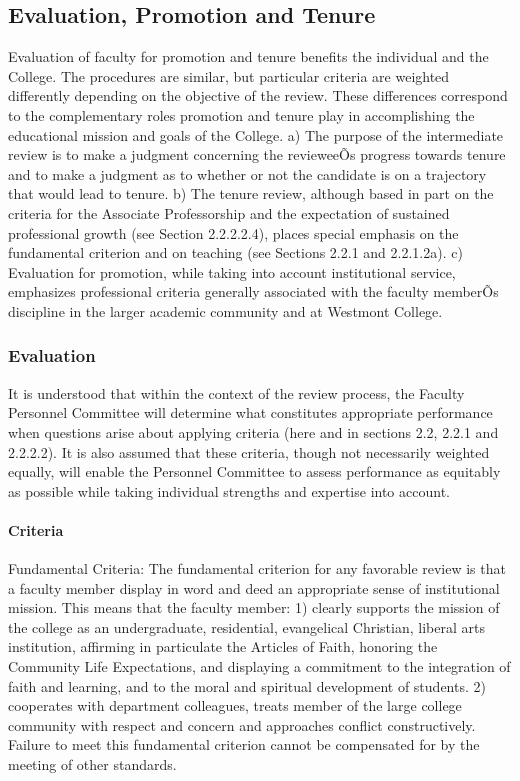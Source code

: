 \documentclass[letterpaper, 11pt]{article}
\begin{document}
	\subsection{Evaluation, Promotion and Tenure}
		Evaluation of faculty for promotion and tenure benefits the individual and the College. The procedures are similar, but particular criteria are weighted differently depending on the objective of the review.  These differences correspond to the complementary roles promotion and tenure play in accomplishing the educational mission and goals of the College.
		a) The purpose of the intermediate review is to make a judgment concerning the revieweeÕs progress towards tenure and to make a judgment as to whether or not the candidate is on a trajectory that would lead to tenure.
		b) The tenure review, although based in part on the criteria for the Associate Professorship and the expectation of sustained professional growth (see Section 2.2.2.2.4), places special emphasis on the fundamental criterion and on teaching (see Sections 2.2.1 and 2.2.1.2a).
		c) Evaluation for promotion, while taking into account institutional service, emphasizes professional criteria generally associated with the faculty memberÕs discipline in the larger academic community and at Westmont College.
		\subsubsection{Evaluation}
			It is understood that within the context of the review process, the Faculty Personnel Committee will determine what constitutes appropriate performance when questions arise about applying criteria (here and in sections 2.2, 2.2.1 and 2.2.2.2).  It is also assumed that these criteria, though not necessarily weighted equally, will enable the Personnel Committee to assess performance as equitably as possible while taking individual strengths and expertise into account.

			\paragraph{Criteria}
				Fundamental Criteria: The fundamental criterion for any favorable review is that a faculty member display in word and deed an appropriate sense of institutional mission. This means that the faculty member:
				1) clearly supports the mission of the college as an undergraduate, residential, evangelical Christian, liberal arts institution, affirming in particulate the Articles of Faith, honoring the Community Life Expectations, and displaying a commitment to the integration of faith and learning, and to the moral and spiritual development of students.
				2) cooperates with department colleagues, treats member of the large college community with respect and concern and approaches conflict constructively.
				Failure to meet this fundamental criterion cannot be compensated for by the meeting of other standards.
\end{document}
